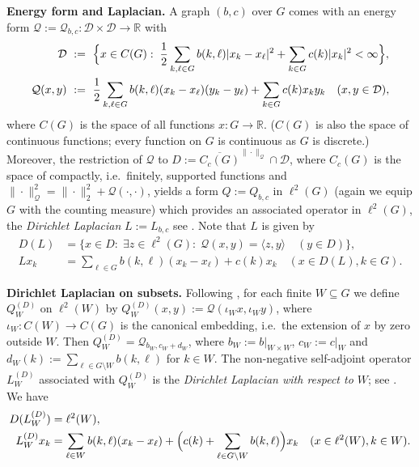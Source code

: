 \documentclass{article}
\newcommand\R{{\mathbb R}}
\numberwithin{equation}{section}   %
\numberwithin{figure}{section}  %
\begin{document}
\textbf{Energy form and Laplacian.}
A graph $(b,c)$ over $G$ comes with an energy form $\mathcal{Q}:=\mathcal{Q}_{b,c}: \mathcal{D}\times \mathcal{D}\to \R$ with
\begin{align*}
    \mathcal{D} &\ :=\ \Bigl\{x\in C(G):\; \frac{1}{2} \sum_{k,\ell\in G} b(k,\ell)|x_k-x_\ell|^2 + \sum_{k\in G} c(k) |x_k|^2 < \infty\Bigr\},\\
    \mathcal{Q}(x,y) &\ :=\ \frac{1}{2} \sum_{k,\ell\in G} b(k,\ell)(x_k-x_\ell)(y_k - y_\ell) + \sum_{k\in G} c(k) x_k y_k  \quad(x,y\in \mathcal{D}),
\end{align*}
where $C(G)$ is the space of all functions $x: G\to \R$. ($C(G)$ is also the space of continuous functions;  every function on $G$ is continuous as $G$ is discrete.) Moreover, the restriction of $\mathcal{Q}$ to
$D:=\overline{C_c(G)}^{\|\cdot\|_{\mathcal{Q}}}\cap \mathcal{D}$, where $C_c(G)$ is the space of compactly, i.e.\ finitely, supported functions and $\|\cdot\|_{\mathcal{Q}}^2 = \|\cdot\|_2^2 + \mathcal{Q}(\cdot,\cdot)$, yields a form $Q:=Q_{b,c}$ in $\ell^2(G)$ (again we equip $G$ with the counting measure) which provides an associated operator in $\ell^2(G)$, the {\sl Dirichlet Laplacian} $L:=L_{b,c}$ see \cite[p.~109]{KellerLenzWojciechowskiBook}. Note that $L$ is given by
\begin{align*}
    D(L) & = \{x\in D:\; \exists z\in\ell^2(G):\; \mathcal{Q}(x,y) = \langle z,y\rangle \quad(y\in D)\},\\ 
    L x_k & = \sum_{\ell\in G} b(k,\ell) (x_k-x_\ell) + c(k)x_k \quad(x\in D(L), k\in G).
\end{align*}

\textbf{Dirichlet Laplacian on subsets.}
Following \cite[\S1.3]{KellerLenzWojciechowskiBook}, for each finite $W\subseteq G$ we define $Q_W^{(D)}$ on $\ell^2(W)$ by $Q_W^{(D)}(x,y):=\mathcal{Q}(\iota_W x,\iota_W y)$, where $\iota_W: C(W) \to C(G)$ is the canonical embedding, i.e.\ the extension of $x$ by zero outside $W$. Then $Q_W^{(D)} = \mathcal{Q}_{b_W,c_W+d_W}$, where $b_W:=b|_{W\times W}$, $c_W:=c|_W$ and $d_W(k):=\sum_{\ell\in G\setminus W} b(k,\ell)$ for $k\in W$.
The non-negative self-adjoint operator $L_W^{(D)}$ associated with $Q_W^{(D)}$ is the {\sl Dirichlet Laplacian with respect to $W$}; see \cite[p.~118]{KellerLenzWojciechowskiBook}. We have
\begin{align*}
    D(L_W^{(D)}) & = \ell^2(W),\\ 
    L_W^{(D)} x_k & = \sum_{\ell\in W} b(k,\ell) (x_k-x_\ell) + \Bigl(c(k)+\sum_{\ell\in G\setminus W} b(k,\ell)\Bigr)x_k \quad(x\in \ell^2(W), k\in W).
\end{align*}
\end{document}
